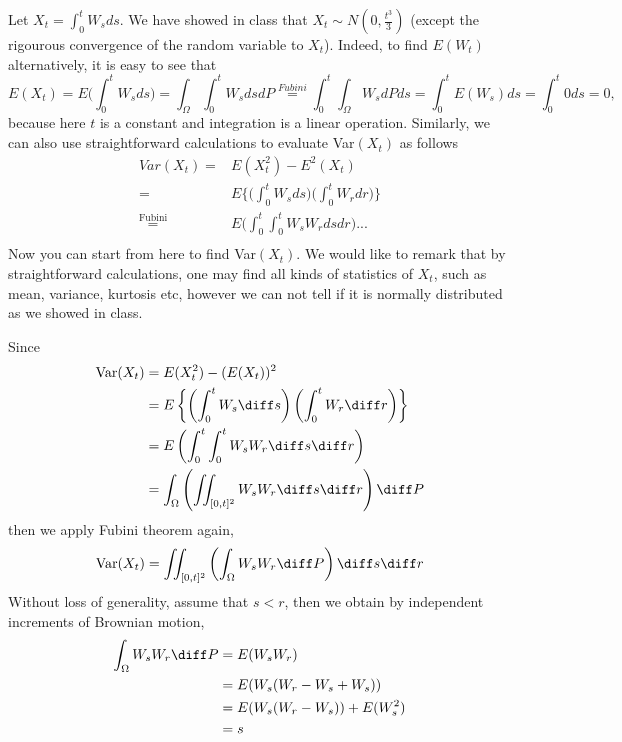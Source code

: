 \newcommand{\var}{\mathrm{Var}}
\newcommand{\cov}{\mathrm{Cov}}

    \problem
    \begin{question}
        Let $X_t=\int_0^t W_s ds$.  We have showed in class that
        $X_t\sim N(0,\frac{t^3}{3})$ (except the rigourous convergence
        of the random variable to $X_t$).  Indeed, to find $E(W_t)$
        alternatively, it is easy to see that
        \[E(X_t)=E\Big(\int_0^t W_s ds\Big)
        =\int_\Omega \int_0^t W_s dsdP
        \overset{Fubini}{=}\int_0^t \int_\Omega W_s dPds
        =\int_0^t E(W_s)ds=\int_0^t0ds=0,\]
        because here $t$ is a constant and integration is a
        linear operation.  Similarly, we can also use straightforward
        calculations to evaluate Var$(X_t)$ as follows
        \begin{align*}
            Var(X_t)= &E(X^2_t)-E^2(X_t)  \\
            =&E\Big\{\Big(\int_0^t W_sds\Big)\Big(\int_0^t W_rdr\Big)\Big\} \\
            \overset{\text{Fubini}}{=}&E \Big(\int_0^t\int_0^t W_s W_rdsdr\Big)... \\
        \end{align*}
        Now you can start from here to find Var$(X_t)$. We would like
        to remark that by straightforward calculations, one may find all
        kinds of statistics of $X_t$, such as mean, variance, kurtosis etc,
        however we can not tell if it is normally distributed as we showed in class.
    \end{question}
    Since
    \[\begin{aligned}
        \var(X_t)&=E(X_t^2)-(E(X_t))^2\\
        &=E\left\{\left(\int_0^tW_s\diff s\right)
        \left(\int_0^tW_r\diff r\right)\right\}\\
        &=E\left(\int_0^t\int_0^tW_sW_r\diff s\diff r\right)\\
        &=\int_\Omega\left(\iint_{[0,t]^2}W_sW_r\diff s\diff r\right)\diff P
    \end{aligned}\]
    then we apply Fubini theorem again,
    \[\var(X_t)=\iint_{[0,t]^2}
    \left(\int_\Omega W_sW_r\diff P\right)\diff s\diff r\]
    Without loss of generality, assume that $s<r$, then we obtain
    by independent increments of Brownian motion,
    \[\begin{aligned}
        \int_\Omega W_sW_r\diff P&=E(W_sW_r)\\
        &=E(W_s(W_r-W_s+W_s))\\
        &=E(W_s(W_r-W_s))+E(W_s^2)\\
        &=s
    \end{aligned}\]
